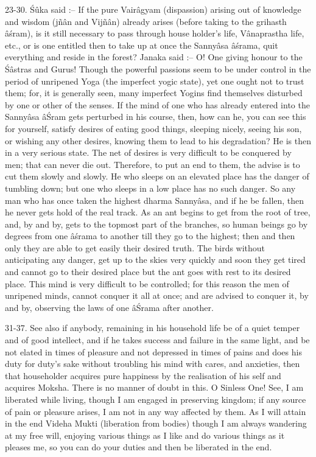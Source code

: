23-30. \'S\^uka said :-- If the pure Vair\^agyam (dispassion) arising out of knowledge and wisdom (jñ\^an and Vijñ\^an) already arises (before taking to the grihasth \^a\'sram), is it still necessary to pass through house holder’s life, V\^anaprastha life, etc., or is one entitled then to take up at once the Sanny\^asa \^a\'srama, quit everything and reside in the forest? Janaka said :-- O! One giving honour to the \'S\^astras and Gurus! Though the powerful passions seem to be under control in the period of unripened Yoga (the imperfect yogic state), yet one ought not to trust them; for, it is generally seen, many imperfect Yogins find themselves disturbed by one or other of the senses. If the mind of one who has already entered into the Sanny\^asa \^a\'Sram gets perturbed in his course, then, how can he, you can see this for yourself, satisfy desires of eating good things, sleeping nicely, seeing his son, or wishing any other desires, knowing them to lead to his degradation? He is then in a very serious state. The net of desires is very difficult to be conquered by men; that can never die out. Therefore, to put an end to them, the advise is to cut them slowly and slowly. He who sleeps on an elevated place has the danger of tumbling down; but one who sleeps in a low place has no such danger. So any man who has once taken the highest dharma Sanny\^asa, and if he be fallen, then he never gets hold of the real track. As an ant begins to get from the root of tree, and, by and by, gets to the topmost part of the branches, so human beings go by degrees from one \^a\'srama to another till they go to the highest; then and then only they are able to get easily their desired truth. The birds without anticipating any danger, get up to the skies very quickly and soon they get tired and cannot go to their desired place but the ant goes with rest to its desired place. This mind is very difficult to be controlled; for this reason the men of unripened minds, cannot conquer it all at once; and are advised to conquer it, by and by, observing the laws of one \^a\'Srama after another.

31-37. See also if anybody, remaining in his household life be of a quiet temper and of good intellect, and if he takes success and failure in the same light, and be not elated in times of pleasure and not depressed in times of pains and does his duty for duty’s sake without troubling his mind with cares, and anxieties, then that householder acquires pure happiness by the realisation of his self and acquires Moksha. There is no manner of doubt in this. O Sinless One! See, I am liberated while living, though I am engaged in preserving kingdom; if any source of pain or pleasure arises, I am not in any way affected by them. As I will attain in the end Videha Mukti (liberation from bodies) though I am always wandering at my free will, enjoying various things as I like and do various things as it pleases me, so you can do your duties and then be liberated in the end.

